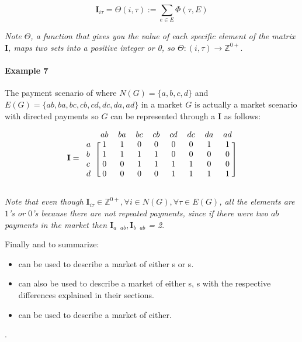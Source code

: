 \documentclass[12pt]{article}
\begin{document}
\begin{multicols}{2}
\begin{equation}
\textbf{I}_{i\tau} = \Theta(i, \tau) := \sum_{e \in E} \Phi (\tau, E)
\end{equation}

\emph{Note $\Theta$, a function that gives you the value of each specific element of the matrix $\mathbf{I}$,  maps two sets into a positive integer or 0, so $\Theta: (i, \tau) \rightarrow \mathbb{Z}^{0+}$}.

\begin{mdframed}
\paragraph{Example 7} \label{ex7}
The payment scenario of  where  $N(G) = \{a, b, c, d\}$ and $E(G) = \{ab, ba, bc, cb, cd, dc, da, ad\}$ in a market $G$ is actually a market scenario with directed payments so $G$ can be represented through a  $\textbf{I}$ as follows:


\begin{equation} \label{eq8}
    \textbf{I} = \begin{blockarray}{lcccccccc}
     & ab & ba & bc & cb & cd & dc & da & ad \\
\begin{block}{l[cccccccc]}
  a & 1 & 1 & 0 & 0 & 0 & 0 & 1 & 1 \\
  b & 1 & 1 & 1 & 1 & 0 & 0 & 0 & 0 \\
  c & 0 & 0 & 1 & 1 & 1 & 1 & 0 & 0 \\
  d & 0 & 0 & 0 & 0 & 1 & 1 & 1 & 1 \\
\end{block}
\end{blockarray}
\end{equation}

\emph{ Note that even though $\textbf{I}_{i\tau} \in \mathbb{Z}^{0+}, \forall i \in N(G), \forall \tau \in E(G)$, all the elements are $1$'s or $0$'s because there are not repeated payments, since if there were two $ab$ payments in the market then $\textbf{I}_{a \text{ }ab}, \textbf{I}_{b \text{ }ab}$ = 2}.

\end{mdframed}

Finally and to summarize:

\begin{itemize}
  \item {} can be used to describe a market of either s or s.
  \item {} can also be used to describe a market of either s, s with the respective differences explained in their sections.
  \item {} can be used to describe a market of either.
\end{itemize}.




\end{multicols}
\end{document}
